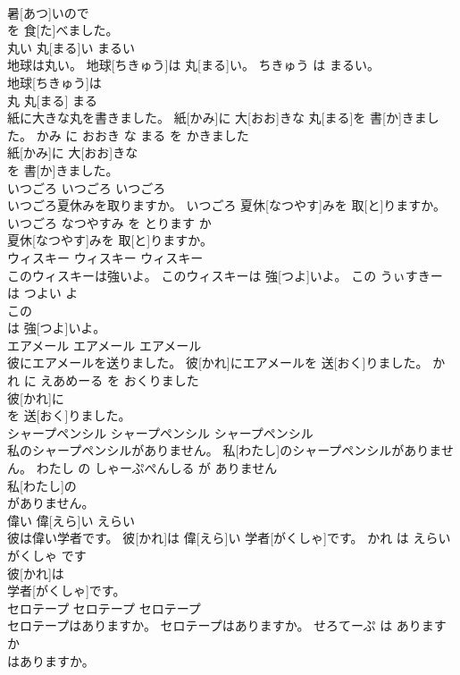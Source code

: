 \documentclass[8pt]{extreport}
\begin{document}
\begin{CJK}{UTF8}{min}
\\	暑[あつ]いので
\\	を 食[た]べました。			
\\	丸い	丸[まる]い	まるい	
\\	地球は丸い。	地球[ちきゅう]は 丸[まる]い。	ちきゅう は まるい。	
\\	地球[ちきゅう]は
\\	丸	丸[まる]	まる	
\\	紙に大きな丸を書きました。	紙[かみ]に 大[おお]きな 丸[まる]を 書[か]きました。	かみ に おおき な まる を かきました	
\\	紙[かみ]に 大[おお]きな
\\	を 書[か]きました。			
\\	いつごろ	いつごろ	いつごろ	
\\	いつごろ夏休みを取りますか。	いつごろ 夏休[なつやす]みを 取[と]りますか。	いつごろ なつやすみ を とります か	
\\	夏休[なつやす]みを 取[と]りますか。			
\\	ウィスキー	ウィスキー	ウィスキー	
\\	このウィスキーは強いよ。	このウィスキーは 強[つよ]いよ。	この うぃすきー は つよい よ	
\\	この
\\	は 強[つよ]いよ。			
\\	エアメール	エアメール	エアメール	
\\	彼にエアメールを送りました。	彼[かれ]にエアメールを 送[おく]りました。	かれ に えあめーる を おくりました	
\\	彼[かれ]に
\\	を 送[おく]りました。			
\\	シャープペンシル	シャープペンシル	シャープペンシル	
\\	私のシャープペンシルがありません。	私[わたし]のシャープペンシルがありません。	わたし の しゃーぷぺんしる が ありません	
\\	私[わたし]の
\\	がありません。			
\\	偉い	偉[えら]い	えらい	
\\	彼は偉い学者です。	彼[かれ]は 偉[えら]い 学者[がくしゃ]です。	かれ は えらい がくしゃ です	
\\	彼[かれ]は
\\	学者[がくしゃ]です。			
\\	セロテープ	セロテープ	セロテープ	
\\	セロテープはありますか。	セロテープはありますか。	せろてーぷ は あります か	
\\	はありますか。			

\end{CJK}
\end{document}
